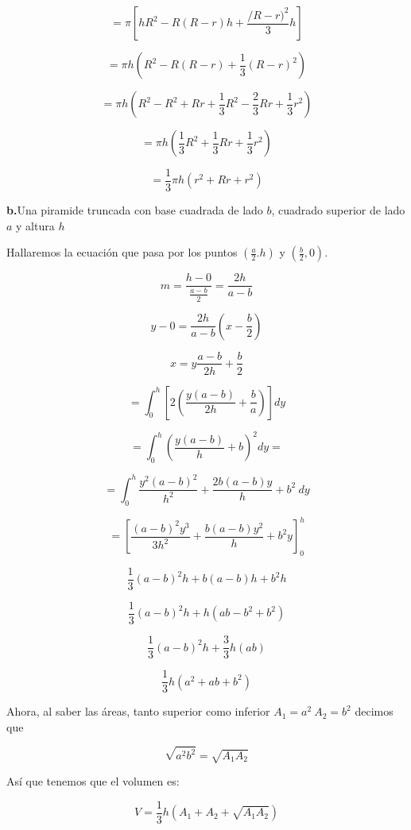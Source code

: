 \documentclass[12pt]{article}
\begin{document}
\begin{flushleft}
$$=\pi\left[hR^{2}-R(R-r)h+\frac{/R-r)^{2}}{3}h\right]$$

$$=\pi h\left(R^{2}-R(R-r)+\frac{1}{3}(R-r)^{2}\right)$$


$$=\pi h\left(R^{2}-R^{2}+Rr+\frac{1}{3}R^{2}-\frac{2}{3}Rr+\frac{1}{3}r^{2}\right)$$

$$=\pi h \left(\frac{1}{3}R^{2}+\frac{1}{3}Rr+\frac{1}{3}r^{2}\right)$$

$$=\frac{1}{3}\pi h\left(r^{2}+Rr+r^{2}\right)$$


\textbf{b.}Una piramide truncada con base cuadrada de lado $b$, cuadrado superior de lado $a$ y altura $h$

Hallaremos la ecuación que pasa por los puntos $(\frac{a}{2}.h)$ y $(\frac{b}{2},0)$.

$$m=\frac{h-0}{\frac{a-b}{2}}=\frac{2h}{a-b}$$

$$y-0=\frac{2h}{a-b}\left(x-\frac{b}{2}\right)$$

$$x=y\frac{a-b}{2h}+\frac{b}{2}$$

$$=\int_{0}^{h}\left[2\left(\frac{y(a-b)}{2h}+\frac{b}{a}\right)\right]dy$$


$$=\int_{0}^{h}\left(\frac{y(a-b)}{h}+b\right)^{2}dy=$$


$$=\int_{0}^{h}\frac{y^{2}(a-b)^{2}}{h^{2}}+\frac{2b(a-b)y}{h}+b^{2}~dy$$


$$=\left [ \frac{(a-b)^{2}y^{3}}{3h^{2}} +\frac{b(a-b)y^{2}}{h}+b^{2}y\right ]_{0}^{h}$$


$$\frac{1}{3}(a-b)^{2}h+b(a-b)h+b^{2}h$$


$$\frac{1}{3}(a-b)^{2}h+h(ab-b^{2}+b^{2})$$


$$\frac{1}{3}(a-b)^{2}h+\frac{3}{3}h(ab)$$

$$\frac{1}{3}h(a^{2}+ab+b^{2})$$


Ahora, al saber las áreas, tanto superior como inferior $A_{1}=a^{2}~A_{2}=b^{2}$ decimos que 


$$\sqrt{a^{2}b^{2}}=\sqrt{A_{1}A_{2}}$$


Así que tenemos que el volumen es: 


$$V=\frac{1}{3}h(A_{1}+A_{2}+\sqrt{A_{1}A_{2}})$$







\end{flushleft}
\end{document}
